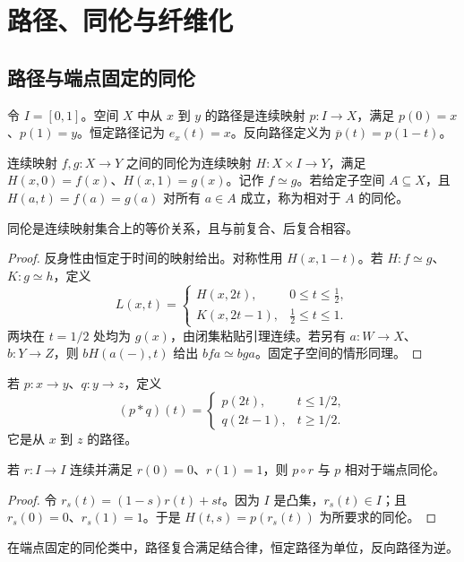 \chapter{路径、同伦与纤维化}
\section{路径与端点固定的同伦}
\begin{definition}[路径]
令 $I=[0,1]$。空间 $X$ 中从 $x$ 到 $y$ 的路径是连续映射 $p:I\to X$，满足 $p(0)=x$、$p(1)=y$。恒定路径记为 $e_x(t)=x$。反向路径定义为 $\overline p(t)=p(1-t)$。
\end{definition}
\begin{definition}[映射之间的同伦]
连续映射 $f,g:X\to Y$ 之间的同伦为连续映射 $H:X\times I\to Y$，满足 $H(x,0)=f(x)$、$H(x,1)=g(x)$。记作 $f\simeq g$。若给定子空间 $A\subseteq X$，且 $H(a,t)=f(a)=g(a)$ 对所有 $a\in A$ 成立，称为相对于 $A$ 的同伦。
\end{definition}
\begin{proposition}
同伦是连续映射集合上的等价关系，且与前复合、后复合相容。
\end{proposition}
\begin{proof}
反身性由恒定于时间的映射给出。对称性用 $H(x,1-t)$。若 $H:f\simeq g$、$K:g\simeq h$，定义
\[
L(x,t)=
\begin{cases}
H(x,2t),&0\le t\le\frac12,\\
K(x,2t-1),&\frac12\le t\le1.
\end{cases}
\]
两块在 $t=1/2$ 处均为 $g(x)$，由闭集粘贴引理连续。若另有 $a:W\to X$、$b:Y\to Z$，则 $bH(a(-),t)$ 给出 $bfa\simeq bga$。固定子空间的情形同理。
\end{proof}
\begin{definition}[路径复合]
若 $p:x\to y$、$q:y\to z$，定义
\[
(p*q)(t)=
\begin{cases}
p(2t),&t\le1/2,\\
q(2t-1),&t\ge1/2.
\end{cases}
\]
它是从 $x$ 到 $z$ 的路径。
\end{definition}
\begin{lemma}[重新参数化]
若 $r:I\to I$ 连续并满足 $r(0)=0$、$r(1)=1$，则 $p\circ r$ 与 $p$ 相对于端点同伦。
\end{lemma}
\begin{proof}
令 $r_s(t)=(1-s)r(t)+st$。因为 $I$ 是凸集，$r_s(t)\in I$；且 $r_s(0)=0$、$r_s(1)=1$。于是 $H(t,s)=p(r_s(t))$ 为所要求的同伦。
\end{proof}
\begin{proposition}[路径群胚的基本等式]
在端点固定的同伦类中，路径复合满足结合律，恒定路径为单位，反向路径为逆。
\end{proposition}
